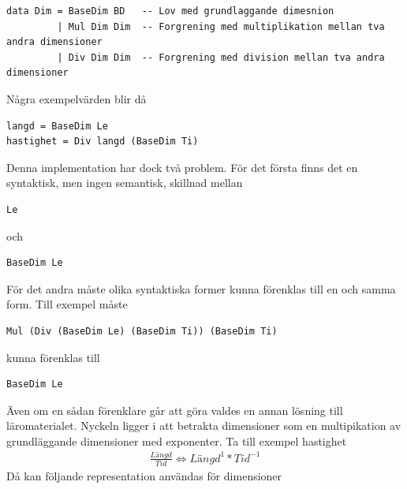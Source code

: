 \begin{draft}
\begin{lstlisting}[frame=none, belowskip=-0.5\baselineskip, xleftmargin=0.5in]
data Dim = BaseDim BD   -- Lov med grundlaggande dimesnion
         | Mul Dim Dim  -- Forgrening med multiplikation mellan tva andra dimensioner
         | Div Dim Dim  -- Forgrening med division mellan tva andra dimensioner
\end{lstlisting}

Några exempelvärden blir då

\begin{lstlisting}[frame=none, belowskip=-0.5\baselineskip, xleftmargin=0.5in]
langd = BaseDim Le
hastighet = Div langd (BaseDim Ti)
\end{lstlisting}

Denna implementation har dock två problem. För det första finns det en syntaktisk, men ingen semantisk, skillnad mellan

\begin{lstlisting}[frame=none, belowskip=-0.5\baselineskip, xleftmargin=0.5in]
Le
\end{lstlisting}

och

\begin{lstlisting}[frame=none, belowskip=-0.5\baselineskip, xleftmargin=0.5in]
BaseDim Le
\end{lstlisting}

För det andra måste olika syntaktiska former kunna förenklas till en och samma form. Till exempel måste

\begin{lstlisting}[frame=none, belowskip=-0.5\baselineskip, xleftmargin=0.5in]
Mul (Div (BaseDim Le) (BaseDim Ti)) (BaseDim Ti)
\end{lstlisting}

kunna förenklas till

\begin{lstlisting}[frame=none, belowskip=-0.5\baselineskip, xleftmargin=0.5in]
BaseDim Le
\end{lstlisting}

Även om en sådan förenklare går att göra valdes en annan lösning till läromaterialet. Nyckeln ligger i att betrakta dimensioner som en multipikation av grundläggande dimensioner med exponenter. Ta till exempel hastighet
\begin{align*}
  \frac{Längd}{Tid} \iff Längd^1 * Tid^{-1}
\end{align*}
Då kan följande representation användas för dimensioner


\end{draft}
